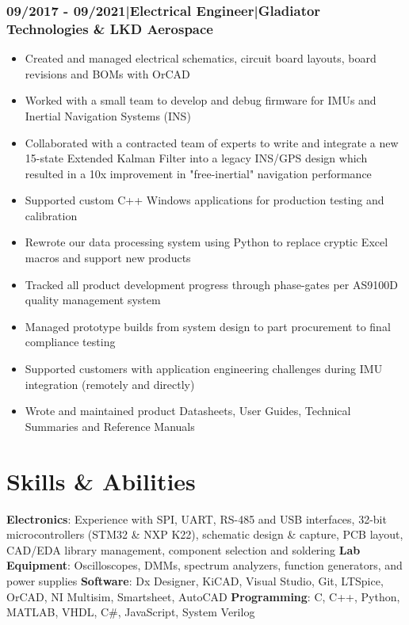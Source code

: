 \documentclass[]{article}
\begin{document}
\begin{singlespace}
\subsubsection*{09/2017 - 09/2021\hspace{3 mm}|\hspace{3 mm}Electrical Engineer\hspace{3 mm}|\hspace{3 mm}Gladiator Technologies \& LKD Aerospace}
\vspace{-2mm}
\begin{itemize}
    \setlength\itemsep{0em}
    \item Created and managed electrical schematics, circuit board layouts, board revisions and BOMs with OrCAD
    \item Worked with a small team to develop and debug firmware for IMUs and Inertial Navigation Systems (INS)
    \item Collaborated with a contracted team of experts to write and integrate a new 15-state Extended Kalman Filter into a legacy INS/GPS design which resulted in a 10x improvement in "free-inertial" navigation performance
    \item Supported custom C++ Windows applications for production testing and calibration
    \item Rewrote our data processing system using Python to replace cryptic Excel macros and support new products
    \item Tracked all product development progress through phase-gates per AS9100D quality management system
    \item Managed prototype builds from system design to part procurement to final compliance testing  
    \item Supported customers with application engineering challenges during IMU integration (remotely and directly)
    \item Wrote and maintained product Datasheets, User Guides, Technical Summaries and Reference Manuals
\end{itemize}

\section*{Skills \& Abilities}

\textbf{Electronics}: Experience with SPI, UART, RS-485 and USB interfaces, 32-bit microcontrollers (STM32 \& NXP K22), schematic design \& capture, PCB layout,
CAD/EDA library management, component selection and soldering
\newline\textbf{Lab Equipment}: Oscilloscopes, DMMs, spectrum analyzers, function generators, and power supplies 
\newline\textbf{Software}: Dx Designer, KiCAD, Visual Studio, Git, LTSpice, OrCAD, NI Multisim, Smartsheet, AutoCAD
\newline\textbf{Programming}: C, C++, Python, MATLAB, VHDL, C\#, JavaScript, System Verilog



\end{singlespace}
\end{document}
